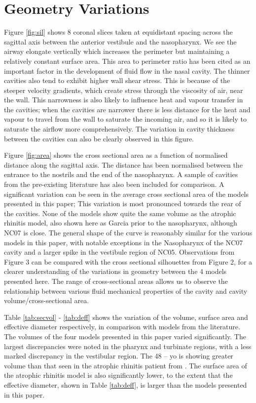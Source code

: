 \section{Geometry Variations}
Figure \ref{fig:sil} shows 8 coronal slices taken at equidistant spacing across the sagittal axis between the anterior vestibule and the nasopharynx. We see the airway elongate vertically which increases the perimeter but maintaining a relatively constant surface area. This area to perimeter ratio has been cited as an important factor in the development of fluid flow in the nasal cavity. The thinner cavities also tend to exhibit higher wall shear stress. This is because of the steeper velocity gradients, which create stress through the viscosity of air, near the wall. This narrowness is also likely to influence heat and vapour transfer in the cavities; when the cavities are narrower there is less distance for the heat and vapour to travel from the wall to saturate the incoming air, and so it is likely to saturate the airflow more comprehensively. The variation in cavity thickness between the cavities can also be clearly observed in this figure.

Figure \ref{fig:area} shows the cross sectional area as a function of normalised distance along the sagittal axis. The distance has been normalised between the entrance to the nostrils and the end of the nasopharynx. A sample of cavities from the pre-existing literature has also been included for comparison. A significant variation can be seen in the average cross sectional area of the models presented in this paper; This variation is most pronounced towards the rear of the cavities. None of the models show quite the same volume as the atrophic rhinitis model, also shown here as Garcia prior to the nasopharynx, although NC07 is close. The general shape of the curve is reasonably similar for the various models in this paper, with notable exceptions in the Nasopharynx of the NC07 cavity and a larger spike in the vestibule region of NC05. Observations from Figure 3 can be compared with the cross sectional silhouettes from Figure 2, for a clearer understanding of the variations in geometry between the 4 models presented here. The range of cross-sectional areas allows us to observe the relationship between various fluid mechanical properties of the cavity and cavity volume/cross-sectional area.

Table \ref{tab:secvol} - \ref{tab:deff} shows the variation of the volume, surface area and effective diameter respectively, in comparison with models from the literature. The volumes of the four models presented in this paper varied significantly. The largest discrepancies were noted in the pharynx and turbinate regions, with a less marked discrepancy in the vestibular region. The 48 – yo is showing greater volume than that seen in the atrophic rhinitis patient from \cite{Garcia2007}. The surface area of the atrophic rhinitis model is also significantly lower, to the extent that the effective diameter, shown in Table \ref{tab:deff}, is larger than the models presented in this paper.

